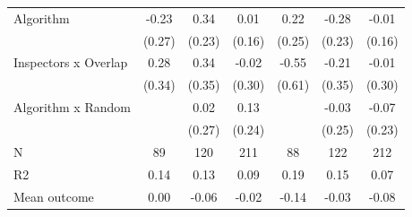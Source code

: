 \begin{tabular}{lccc|ccc}
Algorithm   &       -0.23         &        0.34         &        0.01         &        0.22         &       -0.28         &       -0.01         \\
            &      (0.27)         &      (0.23)         &      (0.16)         &      (0.25)         &      (0.23)         &      (0.16)         \\
\addlinespace
Inspectors x Overlap&        0.28         &        0.34         &       -0.02         &       -0.55         &       -0.21         &       -0.01         \\
            &      (0.34)         &      (0.35)         &      (0.30)         &      (0.61)         &      (0.35)         &      (0.30)         \\
\addlinespace
Algorithm x Random&                     &        0.02         &        0.13         &                     &       -0.03         &       -0.07         \\
            &                     &      (0.27)         &      (0.24)         &                     &      (0.25)         &      (0.23)         \\
\midrule
N           &          89         &         120         &         211         &          88         &         122         &         212         \\
R2          &        0.14         &        0.13         &        0.09         &        0.19         &        0.15         &        0.07         \\
Mean outcome&        0.00         &       -0.06         &       -0.02         &       -0.14         &       -0.03         &       -0.08         \\
\bottomrule \end{tabular}

